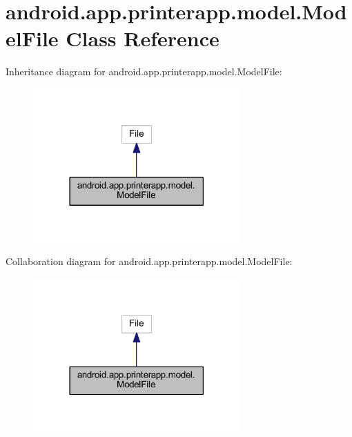 \hypertarget{classandroid_1_1app_1_1printerapp_1_1model_1_1_model_file}{}\section{android.\+app.\+printerapp.\+model.\+Model\+File Class Reference}
\label{classandroid_1_1app_1_1printerapp_1_1model_1_1_model_file}


Inheritance diagram for android.\+app.\+printerapp.\+model.\+Model\+File\+:
\nopagebreak
\begin{figure}[H]
\begin{center}
\leavevmode
\includegraphics[width=225pt]{classandroid_1_1app_1_1printerapp_1_1model_1_1_model_file__inherit__graph}
\end{center}
\end{figure}


Collaboration diagram for android.\+app.\+printerapp.\+model.\+Model\+File\+:
\nopagebreak
\begin{figure}[H]
\begin{center}
\leavevmode
\includegraphics[width=225pt]{classandroid_1_1app_1_1printerapp_1_1model_1_1_model_file__coll__graph}
\end{center}
\end{figure}
